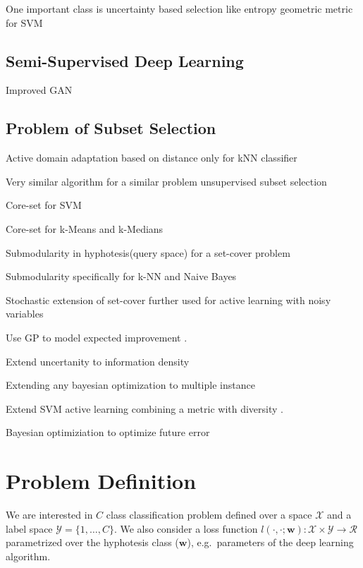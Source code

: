 \documentclass{article}
\begin{document}
One important class is uncertainty based selection \cite{tong2001support,lewissequential,joshi2009multi} like entropy \cite{joshi2009multi} geometric metric for SVM \cite{tong2001support}

\subsection{Semi-Supervised Deep Learning}

Improved GAN \cite{salimans2016improved} \cite{ali} \cite{bigan} \cite{ladder}


\subsection{Problem of Subset Selection}
Active domain adaptation based on distance \cite{BerlindU15} only for kNN classifier

Very similar algorithm for a similar problem \cite{wei2013using} unsupervised subset selection

Core-set for SVM \cite{tsang2005core}

Core-set for k-Means and k-Medians \cite{har2005smaller}

Submodularity in hyphotesis(query space) for a set-cover problem \cite{guillory2010interactive}

Submodularity specifically for k-NN and Naive Bayes \cite{wei2015submodularity}

Stochastic extension of set-cover further used for active learning with noisy variables \cite{golovin2011adaptive}

Use GP to model expected improvement \cite{kapoor2007active}.

Extend uncertanity to information density \cite{li2013adaptive}

Extending any bayesian optimization to multiple instance \cite{wang2016parallel}

Extend SVM active learning combining a metric with diversity \cite{brinker2003incorporating}.

Bayesian optimiziation to optimize future error \cite{roy2001toward}
 


\section{Problem Definition}
We are interested in $C$ class classification problem defined over a space $\mathcal{X}$ and a label space  $\mathcal{Y}=\{1,\ldots,C\}$. We also consider a loss function $l(\cdot,\cdot;\mathbf{w}):\mathcal{X}\times \mathcal{Y} \rightarrow \mathcal{R}$ parametrized over the hyphotesis class ($\mathbf{w}$), e.g.\ parameters of the deep learning algorithm.
\end{document}
